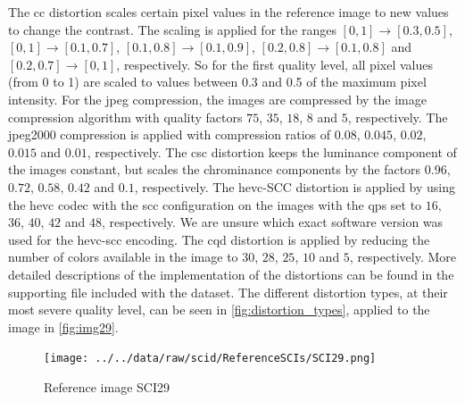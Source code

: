The \gls{cc} distortion scales certain pixel values in the reference image to new values to change the contrast.
The scaling is applied for the ranges $[0,1] \rightarrow [0.3,0.5]$, $[0,1] \rightarrow [0.1,0.7]$, $[0.1,0.8] \rightarrow [0.1,0.9]$, $[0.2,0.8] \rightarrow [0.1,0.8]$ and $[0.2,0.7] \rightarrow [0,1]$, respectively.
So for the first quality level, all pixel values (from 0 to 1) are scaled to values between 0.3 and 0.5 of the maximum pixel intensity.
For the \gls{jpeg} compression, the images are compressed by the image compression algorithm with quality factors $75$, $35$, $18$, $8$ and $5$, respectively.
The \gls{jpeg}2000 compression is applied with compression ratios of $0.08$, $0.045$, $0.02$, $0.015$ and $0.01$, respectively.
The \gls{csc} distortion keeps the luminance component of the images constant, but scales the chrominance components by the factors $0.96$, $0.72$, $0.58$, $0.42$ and $0.1$, respectively.
The \gls{hevc}-SCC distortion is applied by using the \gls{hevc} codec with the \gls{scc} configuration on the images with the \glspl{qp} set to $16$, $36$, $40$, $42$ and $48$, respectively.
We are unsure which exact software version was used for the \gls{hevc}-\gls{scc} encoding.
The \gls{cqd} distortion is applied by reducing the number of colors available in the image to $30$, $28$, $25$, $10$ and $5$, respectively.
More detailed descriptions of the implementation of the distortions can be found in the supporting file included with the dataset.
The different distortion types, at their most severe quality level, can be seen in \autoref{fig:distortion_types}, applied to the image in \autoref{fig:img29}.

\begin{figure}
    \centering
    \texttt{[image: ../../data/raw/scid/ReferenceSCIs/SCI29.png]}
    \caption{Reference image SCI29}
    \label{fig:img29}
\end{figure}

